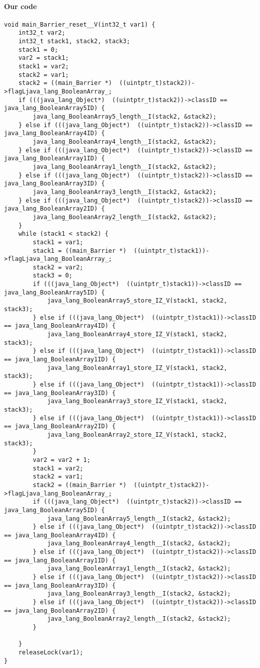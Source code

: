 \paragraph{Our code}\hfill
\begin{lstlisting}[firstnumber=2362]
void main_Barrier_reset__V(int32_t var1) {
	int32_t var2;
	int32_t stack1, stack2, stack3;
	stack1 = 0;
	var2 = stack1;
	stack1 = var2;
	stack2 = var1;
	stack2 = ((main_Barrier *)  ((uintptr_t)stack2))->flagLjava_lang_BooleanArray_;
	if (((java_lang_Object*)  ((uintptr_t)stack2))->classID == java_lang_BooleanArray5ID) {
		java_lang_BooleanArray5_length__I(stack2, &stack2);
	} else if (((java_lang_Object*)  ((uintptr_t)stack2))->classID == java_lang_BooleanArray4ID) {
		java_lang_BooleanArray4_length__I(stack2, &stack2);
	} else if (((java_lang_Object*)  ((uintptr_t)stack2))->classID == java_lang_BooleanArray1ID) {
		java_lang_BooleanArray1_length__I(stack2, &stack2);
	} else if (((java_lang_Object*)  ((uintptr_t)stack2))->classID == java_lang_BooleanArray3ID) {
		java_lang_BooleanArray3_length__I(stack2, &stack2);
	} else if (((java_lang_Object*)  ((uintptr_t)stack2))->classID == java_lang_BooleanArray2ID) {
		java_lang_BooleanArray2_length__I(stack2, &stack2);
	}
	while (stack1 < stack2) {
		stack1 = var1;
		stack1 = ((main_Barrier *)  ((uintptr_t)stack1))->flagLjava_lang_BooleanArray_;
		stack2 = var2;
		stack3 = 0;
		if (((java_lang_Object*)  ((uintptr_t)stack1))->classID == java_lang_BooleanArray5ID) {
			java_lang_BooleanArray5_store_IZ_V(stack1, stack2, stack3);
		} else if (((java_lang_Object*)  ((uintptr_t)stack1))->classID == java_lang_BooleanArray4ID) {
			java_lang_BooleanArray4_store_IZ_V(stack1, stack2, stack3);
		} else if (((java_lang_Object*)  ((uintptr_t)stack1))->classID == java_lang_BooleanArray1ID) {
			java_lang_BooleanArray1_store_IZ_V(stack1, stack2, stack3);
		} else if (((java_lang_Object*)  ((uintptr_t)stack1))->classID == java_lang_BooleanArray3ID) {
			java_lang_BooleanArray3_store_IZ_V(stack1, stack2, stack3);
		} else if (((java_lang_Object*)  ((uintptr_t)stack1))->classID == java_lang_BooleanArray2ID) {
			java_lang_BooleanArray2_store_IZ_V(stack1, stack2, stack3);
		}
		var2 = var2 + 1;
		stack1 = var2;
		stack2 = var1;
		stack2 = ((main_Barrier *)  ((uintptr_t)stack2))->flagLjava_lang_BooleanArray_;
		if (((java_lang_Object*)  ((uintptr_t)stack2))->classID == java_lang_BooleanArray5ID) {
			java_lang_BooleanArray5_length__I(stack2, &stack2);
		} else if (((java_lang_Object*)  ((uintptr_t)stack2))->classID == java_lang_BooleanArray4ID) {
			java_lang_BooleanArray4_length__I(stack2, &stack2);
		} else if (((java_lang_Object*)  ((uintptr_t)stack2))->classID == java_lang_BooleanArray1ID) {
			java_lang_BooleanArray1_length__I(stack2, &stack2);
		} else if (((java_lang_Object*)  ((uintptr_t)stack2))->classID == java_lang_BooleanArray3ID) {
			java_lang_BooleanArray3_length__I(stack2, &stack2);
		} else if (((java_lang_Object*)  ((uintptr_t)stack2))->classID == java_lang_BooleanArray2ID) {
			java_lang_BooleanArray2_length__I(stack2, &stack2);
		}

	}
	releaseLock(var1);
}
\end{lstlisting}

